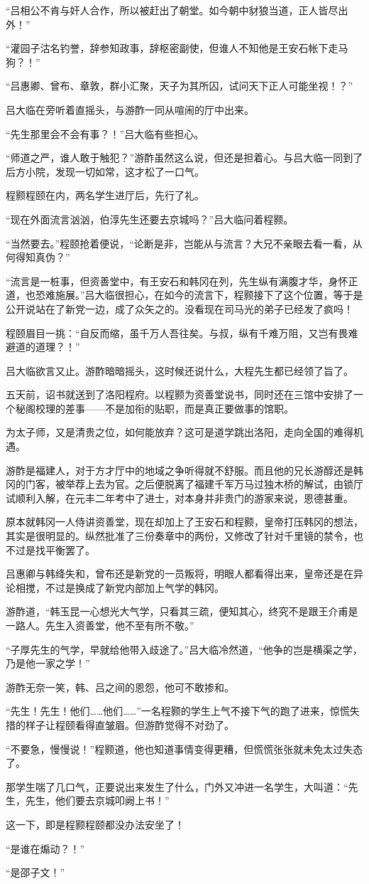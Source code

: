 “吕相公不肯与奸人合作，所以被赶出了朝堂。如今朝中豺狼当道，正人皆尽出外！”

“灌园子沽名钓誉，辞参知政事，辞枢密副使，但谁人不知他是王安石帐下走马狗？！”

“吕惠卿、曾布、章敦，群小汇聚，天子为其所囚，试问天下正人可能坐视！？”

吕大临在旁听着直摇头，与游酢一同从喧闹的厅中出来。

“先生那里会不会有事？！”吕大临有些担心。

“师道之严，谁人敢于触犯？”游酢虽然这么说，但还是担着心。与吕大临一同到了后方小院，发现一切如常，这才松了一口气。

程颢程颐在内，两名学生进厅后，先行了礼。

“现在外面流言汹汹，伯淳先生还要去京城吗？”吕大临问着程颢。

“当然要去。”程颐抢着便说，“论断是非，岂能从与流言？大兄不亲眼去看一看，从何得知真伪？”

“流言是一桩事，但资善堂中，有王安石和韩冈在列，先生纵有满腹才华，身怀正道，也恐难施展。”吕大临很担心，在如今的流言下，程颢接下了这个位置，等于是公开说站在了新党一边，成了众矢之的。没看现在司马光的弟子已经发了疯吗！

程颐眉目一挑：“自反而缩，虽千万人吾往矣。与叔，纵有千难万阻，又岂有畏难避道的道理？！”

吕大临欲言又止。游酢暗暗摇头，这时候还说什么，大程先生都已经领了旨了。

五天前，诏书就送到了洛阳程府。以程颢为资善堂说书，同时还在三馆中安排了一个秘阁校理的差事——不是加衔的贴职，而是真正要做事的馆职。

为太子师，又是清贵之位，如何能放弃？这可是道学跳出洛阳，走向全国的难得机遇。

游酢是福建人，对于方才厅中的地域之争听得就不舒服。而且他的兄长游醇还是韩冈的门客，被举荐上去为官。之后便脱离了福建千军万马过独木桥的解试，由锁厅试顺利入解，在元丰二年考中了进士，对本身并非贵门的游家来说，恩德甚重。

原本就韩冈一人侍讲资善堂，现在却加上了王安石和程颢，皇帝打压韩冈的想法，其实是很明显的。纵然批准了三份奏章中的两份，又修改了针对千里镜的禁令，也不过是找平衡罢了。

吕惠卿与韩绛失和，曾布还是新党的一员叛将，明眼人都看得出来，皇帝还是在异论相搅，不过是换成了新党内部加上气学的韩冈。

游酢道，“韩玉昆一心想光大气学，只看其三疏，便知其心，终究不是跟王介甫是一路人。先生入资善堂，他不至有所不敬。”

“子厚先生的气学，早就给他带入歧途了。”吕大临冷然道，“他争的岂是横渠之学，乃是他一家之学！”

游酢无奈一笑，韩、吕之间的恩怨，他可不敢掺和。

“先生！先生！他们……他们……”一名程颢的学生上气不接下气的跑了进来，惊慌失措的样子让程颐看得直皱眉。但游酢觉得不对劲了。

“不要急，慢慢说！”程颢道，他也知道事情变得更糟，但慌慌张张就未免太过失态了。

那学生喘了几口气，正要说出来发生了什么，门外又冲进一名学生，大叫道：“先生，先生，他们要去京城叩阙上书！”

这一下，即是程颢程颐都没办法安坐了！

“是谁在煽动？！”

“是邵子文！”


